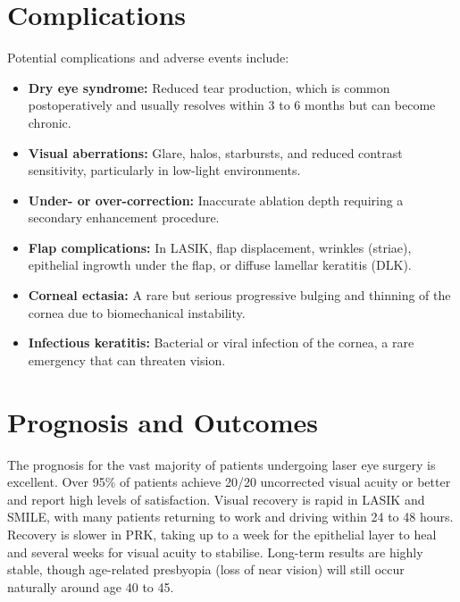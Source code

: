 \section*{Complications}
Potential complications and adverse events include:
\begin{itemize}
    \item \textbf{Dry eye syndrome:} Reduced tear production, which is common postoperatively and usually resolves within 3 to 6 months but can become chronic.
    \item \textbf{Visual aberrations:} Glare, halos, starbursts, and reduced contrast sensitivity, particularly in low-light environments.
    \item \textbf{Under- or over-correction:} Inaccurate ablation depth requiring a secondary enhancement procedure.
    \item \textbf{Flap complications:} In LASIK, flap displacement, wrinkles (striae), epithelial ingrowth under the flap, or diffuse lamellar keratitis (DLK).
    \item \textbf{Corneal ectasia:} A rare but serious progressive bulging and thinning of the cornea due to biomechanical instability.
    \item \textbf{Infectious keratitis:} Bacterial or viral infection of the cornea, a rare emergency that can threaten vision.
\end{itemize}

\section*{Prognosis and Outcomes}
The prognosis for the vast majority of patients undergoing laser eye surgery is excellent. Over 95\% of patients achieve 20/20 uncorrected visual acuity or better and report high levels of satisfaction. Visual recovery is rapid in LASIK and SMILE, with many patients returning to work and driving within 24 to 48 hours. Recovery is slower in PRK, taking up to a week for the epithelial layer to heal and several weeks for visual acuity to stabilise. Long-term results are highly stable, though age-related presbyopia (loss of near vision) will still occur naturally around age 40 to 45.

